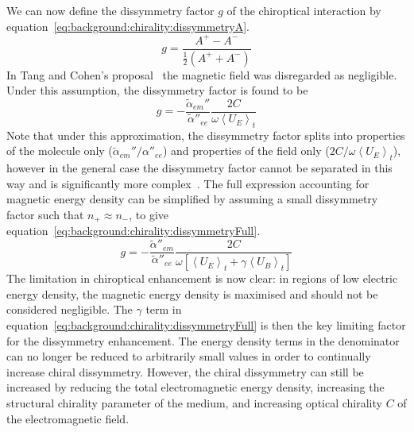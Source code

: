 We can now define the dissymmetry factor $g$ of the chiroptical interaction by equation~\ref{eq:background:chirality:dissymmetryA}.
\begin{equation}\label{eq:background:chirality:dissymmetryA}
    g = \frac{{{A^ + } - {A^ - }}}{\frac{1}{2}({A^ + } + {A^ - })}
\end{equation}
In Tang and Cohen's proposal~\cite{Tang2010} the magnetic field was disregarded as negligible. Under this assumption, the dissymmetry factor is found to be 
\begin{equation}\label{eq:background:chirality:dissymmetryG}
    g =  - \frac{{{\tilde \alpha }_{em}''}}{{\tilde \alpha ''}_{ee}}\frac{{2C}}{{\omega {{\left\langle {{U_E}} \right\rangle }_t}}}
\end{equation}
Note that under this approximation, the dissymmetry factor splits into properties of the molecule only (${{\tilde \alpha }_{em}''}/{{\alpha }''}_{ee}$) and properties of the field only (${2C}/{\omega {{\left\langle {{U}_{E}} \right\rangle }_{t}}}$), however in the general case the dissymmetry factor cannot be separated in this way and is significantly more complex~\cite{Choi2012}.
The full expression accounting for magnetic energy density can be simplified by assuming a small dissymmetry factor such that $n_{+} \approx n_{-}$, to give equation~\ref{eq:background:chirality:dissymmetryFull}.~\cite{Choi2012}
\begin{equation}\label{eq:background:chirality:dissymmetryFull}
    g =  - \frac{{\tilde \alpha ''}_{em}}{{{\tilde \alpha ''}_{ee}}}\frac{{2C}}{{\omega [{{\left\langle {{U_E}} \right\rangle }_t} + \gamma {{\left\langle {{U_B}} \right\rangle }_t}]}}
\end{equation}
The limitation in chiroptical enhancement is now clear: in regions of low electric energy density, the magnetic energy density is maximised and should not be considered negligible. The $\gamma$ term in equation~\ref{eq:background:chirality:dissymmetryFull} is then the key limiting factor for the dissymmetry enhancement. The energy density terms in the denominator can no longer be reduced to arbitrarily small values in order to continually increase chiral dissymmetry. However, the chiral dissymmetry can still be increased by reducing the total electromagnetic energy density, increasing the structural chirality parameter of the medium, and increasing optical chirality $C$ of the electromagnetic field. 

